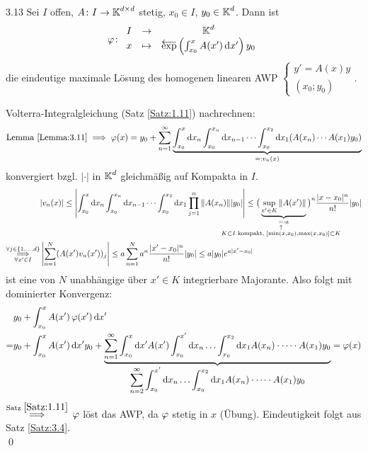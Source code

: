 \documentclass[a4paper]{article}
\begin{document}
\begin{Satz}{}{3.13}
Sei $I$ offen, $A\colon I\to\operatorname{\mathbb K}^{d\times d}$ stetig, $x_0\in I$, $y_0\in\operatorname{\mathbb K}^d$. Dann ist
\[\operatorname{\varphi}\colon \begin{array}{clc}
I&\to&\operatorname{\mathbb K}^d\\
x&\mapsto& \overleftarrow{\exp}\left(\int_{x_0}^xA(x')\mathop{}\!\mathrm{d} x'\right)y_0
\end{array}
\]
die eindeutige maximale Lösung des homogenen linearen AWP $\left\{ \begin{array}{c}
y'=A(x)y\\
(x_0;y_0)
\end{array}\right. $.
\end{Satz}

\begin{Beweis}
Volterra-Integralgleichung (Satz \ref{Satz:1.11}) nachrechnen:
\[\text{Lemma }\ref{Lemma:3.11}\implies \operatorname{\varphi}(x)=y_0+\sum_{n=1}^{\infty}\underbrace{\int_{x_0}^x\mathop{}\!\mathrm{d} x_n\int_{x_0}^{x_n}\mathop{}\!\mathrm{d} x_{n-1}\cdots\int_{x_0}^{x_2}\mathop{}\!\mathrm{d} x_1 (A(x_n)\cdots A(x_1)y_0)}_{=:v_n(x)}\]
konvergiert bzgl. $|\cdot|$ in $\operatorname{\mathbb K}^d$ gleichmäßig auf Kompakta in $I$.
\begin{align*}
&|v_n(x)|\le\left|\int_{x_0}^x\dd x_n\int_{x_0}^{x_n}\dd x_{n-1}\cdots\int_{x_0}^{x_2}\dd x_1\prod_{j=1}^n\|A(x_n)\||y_0|\right|
\le \big(\underbrace{\sup_{x'\in K}\|A(x')\|}_{\underset{\mathclap{\substack{\uparrow\\ K\subset I\te{kompakt, }[\min(x,x_0),\max(x,x_0)]\subset K}}}{=}:a}\big)^n\frac{|x-x_0|^n}{n!}|y_0|\\
\overset{\forall j\in\{1,\ldots,d\}}{\underset{\forall x'\in I}{\implies}}&\left|\sum_{n=1}^N(A(x')v_n(x'))_j\right|\le a\sum_{n=1}^Na^n\frac{|x'-x_0|^n}{n!}|y_0|\le a|y_0|e^{a|x'-x_0|}
\end{align*}
ist eine von $N$ unabhängige über $x'\in K$ integrierbare Majorante. Also folgt mit dominierter Konvergenz:
\begin{align*}
&y_0+\int_{x_0}^xA(x')\operatorname{\varphi}(x')\mathop{}\!\mathrm{d} x'\\
=& y_0+\int_{x_0}^xA(x')\mathop{}\!\mathrm{d} x'y_0+\underbrace{\sum_{n=1}^{\infty}\int_{x_0}^x\mathop{}\!\mathrm{d} x'A(x')\int_{x_0}^{x'}\mathop{}\!\mathrm{d} x_n\dots\int_{x_0}^{x_2}\mathop{}\!\mathrm{d} x_1 A(x_n)\cdot\dots\cdot A(x_1)y_0}_{\displaystyle\sum_{n=2}^{\infty}\int_{x_0}^{x'}\mathop{}\!\mathrm{d} x_n\dots\int_{x_0}^{x_2}\mathop{}\!\mathrm{d} x_1 A(x_n)\cdot\dots\cdot A(x_1)y_0}=\operatorname{\varphi}(x)
\end{align*}
$\overset{\text{Satz }\ref{Satz:1.11}}{\implies}$ $\operatorname{\varphi}$ löst das AWP, da $\operatorname{\varphi}$ stetig in $x$ (Übung). Eindeutigkeit folgt aus Satz \ref{Satz:3.4}.\\\qed
\end{Beweis}
\end{document}
